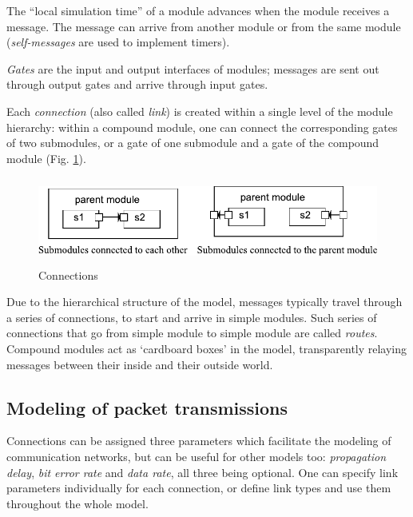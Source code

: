 The ``local simulation time'' of a module advances when the module
receives a message. The message can arrive from another module
or from the same module (\textit{self-messages} are used to implement
timers).


\textit{Gates} are the input and output interfaces of
modules; messages are sent out through output gates and arrive through
input gates.

Each \textit{connection} (also called
\textit{link}) is created within a single level of the
module hierarchy: within a compound module, one can connect the
corresponding gates of two submodules, or a gate of one submodule and
a gate of the compound module (Fig.
\ref{fig:ch-overview:connections}).

\begin{figure}[htbp]
\begin{center}
\includegraphics[width=5.061in, height=1.121in]{figures/usmanFig3}
\caption{Connections}
\label{fig:ch-overview:connections}
\end{center}
\end{figure}

Due to the hierarchical structure of the model, messages typically
travel through a series of connections, to start and arrive in simple
modules. Such series of connections that go from simple module to
simple module are called \textit{routes}.  Compound modules act as
`cardboard boxes' in the model, transparently relaying messages
between their inside and their outside world.


\subsection{Modeling of packet transmissions}

Connections can be assigned three parameters which facilitate
the modeling of communication networks, but can be useful for
other models too: \textit{propagation delay}, \textit{bit error rate}
and \textit{data rate}, all three being optional. One can specify
link parameters individually for each connection, or define link types
and use them throughout the whole model.

